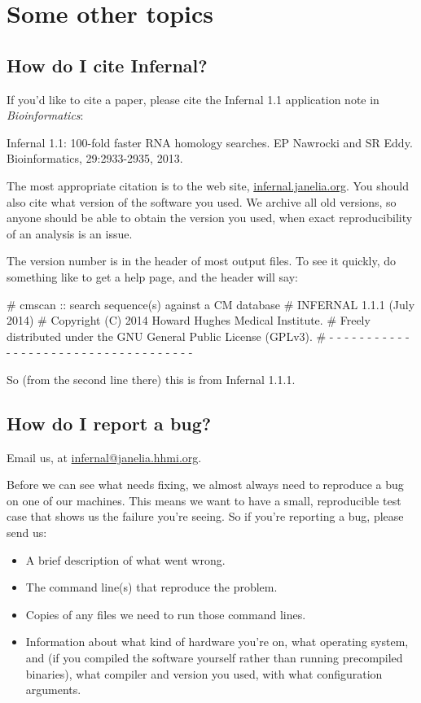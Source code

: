 \section{Some other topics}
\label{section:more}
\setcounter{footnote}{0}

\subsection{How do I cite Infernal?}

If you'd like to cite a paper, please cite the Infernal 1.1 application
note in \emph{Bioinformatics}:

Infernal 1.1: 100-fold faster RNA homology searches.
EP Nawrocki and SR Eddy.
Bioinformatics, 29:2933-2935, 2013.

The most appropriate citation is to the web site,
\url{infernal.janelia.org}. You should also cite what version of the
software you used. We archive all old versions, so anyone should be
able to obtain the version you used, when exact reproducibility of an
analysis is an issue.

The version number is in the header of most output files. To see it
quickly, do something like  to get a help page, and
the header will say:

\begin{sreoutput}
# cmscan :: search sequence(s) against a CM database
# INFERNAL 1.1.1 (July 2014)
# Copyright (C) 2014 Howard Hughes Medical Institute.
# Freely distributed under the GNU General Public License (GPLv3).
# - - - - - - - - - - - - - - - - - - - - - - - - - - - - - - - - - - - -
\end{sreoutput}

So (from the second line there) this is from Infernal 1.1.1.

\subsection{How do I report a bug?}

Email us, at \url{infernal@janelia.hhmi.org}.

Before we can see what needs fixing, we almost always need to
reproduce a bug on one of our machines. This means we want to have a
small, reproducible test case that shows us the failure you're seeing.
So if you're reporting a bug, please send us:

\begin{itemize}
 \item A brief description of what went wrong.
 \item The command line(s) that reproduce the problem.
 \item Copies of any files we need to run those command lines.
 \item Information about what kind of hardware you're on, what
   operating system, and (if you compiled the software yourself rather
   than running precompiled binaries), what compiler and version you
   used, with what configuration arguments.
\end{itemize}

